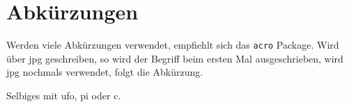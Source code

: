 \section{Abkürzungen}

Werden viele Abkürzungen verwendet, empfiehlt sich das \texttt{acro} Package. Wird über \ac{jpg} geschreiben,
so wird der Begriff beim ersten Mal ausgeschrieben, wird \ac{jpg} nochmals verwendet, folgt die Abkürzung.

Selbiges mit \ac{ufo}, \ac{pi} oder \ac{c}.





